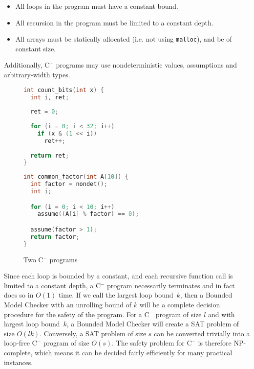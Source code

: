\documentclass[a4paper]{llncs}
\newcommand{\newC}{C$^-$\xspace}
\begin{document}
\begin{itemize}
 \item All loops in the program must have a constant bound.
 \item All recursion in the program must be limited to a constant depth.
 \item All arrays must be statically allocated (i.e. not using \texttt{malloc}),
 and be of constant size.
\end{itemize}

Additionally, \newC programs may use nondeterministic values, assumptions
and arbitrary-width types.

\begin{figure}
\begin{minipage}[scale=0.8]{0.45\linewidth}
 \begin{lstlisting}[language=c]
int count_bits(int x) {
  int i, ret;
  
  ret = 0;
  
  for (i = 0; i < 32; i++)
    if (x & (1 << i))
      ret++;
  
  return ret;
}
 \end{lstlisting}
\end{minipage}
\begin{minipage}{0.54\linewidth}
 \begin{lstlisting}[language=C]
int common_factor(int A[10]) {
  int factor = nondet();
  int i;

  for (i = 0; i < 10; i++)
    assume((A[i] % factor) == 0);

  assume(factor > 1);
  return factor;
}

 \end{lstlisting}
\end{minipage}

 \caption{Two \newC programs}
 \label{fig:c-}

\end{figure}

Since each loop is bounded by a constant, and each recursive function call is
limited to a constant depth, a \newC program necessarily terminates and in
fact does so in $O(1)$ time.  If we call the largest loop bound~$k$, then
a Bounded Model Checker with an unrolling bound of $k$ will be a complete
decision procedure for the safety of the program.  For a \newC program of
size $l$ and with largest loop bound~$k$, a Bounded Model Checker will
create a SAT problem of size $O(lk)$.  Conversely, a SAT problem
of size $s$ can be converted trivially into a loop-free \newC program
of size $O(s)$.  The safety problem for \newC is therefore NP-complete,
which means it can be decided fairly efficiently for many practical
instances.
\end{document}
